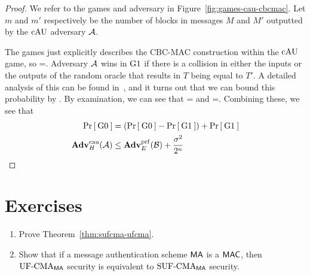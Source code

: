 \begin{proof}
	We refer to the games and adversary in Figure~\ref{fig:games-cau-cbcmac}. Let $m$ and $m'$ respectively be the number of blocks in messages $M$ and $M'$ outputted by the $\textnormal{cAU}$ adversary ${\mathcal A}$. 
	
	The games just explicitly describes the CBC-MAC construction within the $\textnormal{cAU}$ game, so 
	\bnm
	=\;.
	\enm
	Adversary ${\mathcal A}$ wins in ${{\textnormal G}}1$ if there is a collision in either the inputs or the outputs of the random oracle that results in $T$ being equal to $T'$. A detailed analysis of this can be found in~\cite{black2000cbc}, and it turns out that we can bound this probability by 
	\bnm
	\leq {}\;.
	\enm
	By examination, we can see that 
	\bnm
	=
	\enm
	and
	\bnm
	=\;.
	\enm
	Combining these, we see that 
	\begin{align*}
	\Pr\left[\: {{\textnormal G}}0 \:\right]&=(\Pr\left[\: {{\textnormal G}}0 \:\right]-\Pr\left[\: {{\textnormal G}}1 \:\right]) + \Pr\left[\: {{\textnormal G}}1 \:\right]\\
	\mathbf{Adv}^{\mathrm{cau}}_{H}({\mathcal A})&\leq \mathbf{Adv}^{\mathrm{prf}}_{E}({\mathcal B}) + \frac{\sigma^2}{2^n}
	\end{align*}
\end{proof}

\section*{Exercises}
\begin{enumerate}[label=\textbf{Exercise \thesection.\arabic*}, wide=0pt]
	\item Prove Theorem~\ref{thm:sufcma-ufcma}. \label{exercise:sufcma-ufcma}
	\item Show that if a message authentication scheme $\mathsf{MA}$ is a $\mathsf{MAC}$, then $\textnormal{UF-CMA}_{\mathsf{MA}}$ security is equivalent to $\textnormal{SUF-CMA}_{\mathsf{MA}}$ security. \label{exercise:mac-sufcma-ufcma}
\end{enumerate}